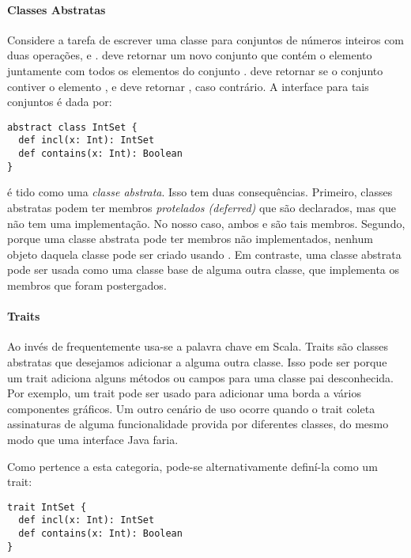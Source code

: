 \paragraph{Classes Abstratas}

Considere a tarefa de escrever uma classe para conjuntos de n\'{u}meros inteiros com 
duas opera\c{c}\~{o}es,  e .  deve retornar
um novo conjunto que cont\'{e}m o elemento  juntamente com todos os elementos 
do conjunto .  deve retornar  se o conjunto 
 contiver o elemento , e deve retornar , caso contr\'{a}rio.
A interface para tais conjuntos \'{e} dada por:
\begin{lstlisting}
abstract class IntSet {
  def incl(x: Int): IntSet
  def contains(x: Int): Boolean
}
\end{lstlisting}

 \'{e} tido como uma {\em classe abstrata}. Isso tem duas consequ\^{e}ncias. 
Primeiro, classes abstratas podem ter membros {\em protelados (deferred)} que s\~{a}o 
declarados, mas que n\~{a}o tem uma implementa\c{c}\~{a}o. No nosso caso, ambos  e 
 s\~{a}o tais membros. Segundo, porque uma classe abstrata pode ter 
membros n\~{a}o implementados, nenhum objeto daquela classe pode ser criado usando .
Em contraste, uma classe abstrata pode ser usada como uma classe base de alguma outra
classe, que implementa os membros que foram postergados. 

\paragraph{Traits}

Ao inv\'{e}s de  frequentemente usa-se a palavra chave
 em Scala. Traits s\~{a}o classes abstratas que desejamos adicionar
a alguma outra classe. Isso pode ser porque um trait adiciona alguns m\'{e}todos
ou campos para uma classe pai desconhecida. Por exemplo, um trait  
pode ser usado para adicionar uma borda a v\'{a}rios componentes gr\'{a}ficos. Um outro
cen\'{a}rio de uso ocorre quando o trait coleta assinaturas de alguma funcionalidade 
provida por diferentes classes, do mesmo modo que uma interface Java faria.

Como  pertence a esta categoria, pode-se alternativamente 
defin\'{i}-la como um trait:
\begin{lstlisting}
trait IntSet {
  def incl(x: Int): IntSet
  def contains(x: Int): Boolean
}
\end{lstlisting}

